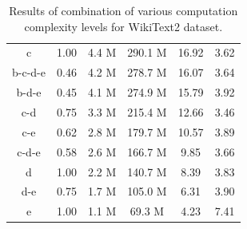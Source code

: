 \documentclass{article} %
\begin{document}
\begin{table}[hbtp]
{\begin{tabular}{@{}cccccc@{}}
c         & 1.00  & 4.4 M      & 290.1 M & 16.92      & 3.62       \\
b-c-d-e   & 0.46  & 4.2 M      & 278.7 M & 16.07      & 3.64       \\
b-d-e     & 0.45  & 4.1 M      & 274.9 M & 15.79      & 3.92       \\
c-d       & 0.75  & 3.3 M      & 215.4 M & 12.66      & 3.46       \\
c-e       & 0.62  & 2.8 M      & 179.7 M & 10.57      & 3.89       \\
c-d-e     & 0.58  & 2.6 M      & 166.7 M & 9.85       & 3.66       \\
d         & 1.00  & 2.2 M      & 140.7 M & 8.39       & 3.83       \\
d-e       & 0.75  & 1.7 M      & 105.0 M & 6.31       & 3.90       \\
e         & 1.00  & 1.1 M      & 69.3 M  & 4.23       & 7.41       \\ \bottomrule
\end{tabular}
}
\caption{Results of combination of various computation complexity levels for WikiText2 dataset.}
\label{tab:WikiText2_appendix}
\end{table}
\end{document}
